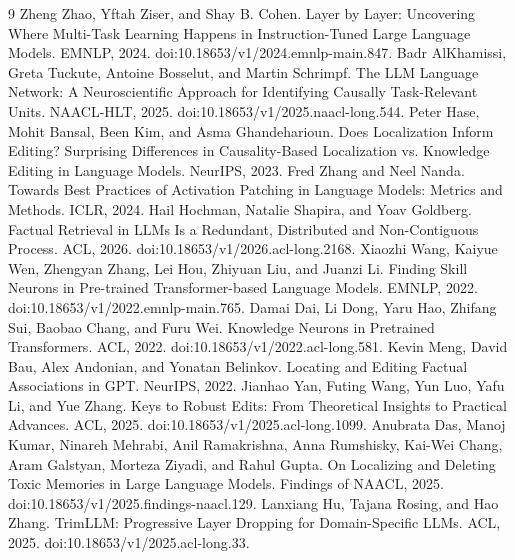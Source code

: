 \documentclass[10pt,twocolumn]{article}
\begin{document}
\begin{thebibliography}{9}
 Zheng Zhao, Yftah Ziser, and Shay B. Cohen. Layer by Layer: Uncovering Where Multi-Task Learning Happens in Instruction-Tuned Large Language Models. EMNLP, 2024. doi:10.18653/v1/2024.emnlp-main.847.
 Badr AlKhamissi, Greta Tuckute, Antoine Bosselut, and Martin Schrimpf. The LLM Language Network: A Neuroscientific Approach for Identifying Causally Task-Relevant Units. NAACL-HLT, 2025. doi:10.18653/v1/2025.naacl-long.544.
 Peter Hase, Mohit Bansal, Been Kim, and Asma Ghandeharioun. Does Localization Inform Editing? Surprising Differences in Causality-Based Localization vs. Knowledge Editing in Language Models. NeurIPS, 2023.
 Fred Zhang and Neel Nanda. Towards Best Practices of Activation Patching in Language Models: Metrics and Methods. ICLR, 2024.
 Hail Hochman, Natalie Shapira, and Yoav Goldberg. Factual Retrieval in LLMs Is a Redundant, Distributed and Non-Contiguous Process. ACL, 2026. doi:10.18653/v1/2026.acl-long.2168.
 Xiaozhi Wang, Kaiyue Wen, Zhengyan Zhang, Lei Hou, Zhiyuan Liu, and Juanzi Li. Finding Skill Neurons in Pre-trained Transformer-based Language Models. EMNLP, 2022. doi:10.18653/v1/2022.emnlp-main.765.
 Damai Dai, Li Dong, Yaru Hao, Zhifang Sui, Baobao Chang, and Furu Wei. Knowledge Neurons in Pretrained Transformers. ACL, 2022. doi:10.18653/v1/2022.acl-long.581.
 Kevin Meng, David Bau, Alex Andonian, and Yonatan Belinkov. Locating and Editing Factual Associations in GPT. NeurIPS, 2022.
 Jianhao Yan, Futing Wang, Yun Luo, Yafu Li, and Yue Zhang. Keys to Robust Edits: From Theoretical Insights to Practical Advances. ACL, 2025. doi:10.18653/v1/2025.acl-long.1099.
 Anubrata Das, Manoj Kumar, Ninareh Mehrabi, Anil Ramakrishna, Anna Rumshisky, Kai-Wei Chang, Aram Galstyan, Morteza Ziyadi, and Rahul Gupta. On Localizing and Deleting Toxic Memories in Large Language Models. Findings of NAACL, 2025. doi:10.18653/v1/2025.findings-naacl.129.
 Lanxiang Hu, Tajana Rosing, and Hao Zhang. TrimLLM: Progressive Layer Dropping for Domain-Specific LLMs. ACL, 2025. doi:10.18653/v1/2025.acl-long.33.
\end{thebibliography}
\end{document}
